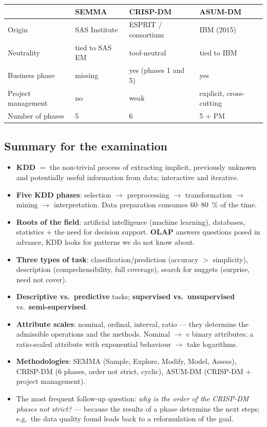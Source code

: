 \documentclass[11pt,a4paper]{article}
\theoremstyle{definition}
\begin{document}
\begin{center}
\small
\begin{tabular}{@{}llll@{}}
\toprule
& \textbf{SEMMA} & \textbf{CRISP-DM} & \textbf{ASUM-DM} \\
\midrule
Origin & SAS Institute & ESPRIT / consortium & IBM (2015) \\
Neutrality & tied to SAS EM & tool-neutral & tied to IBM \\
Business phase & missing & yes (phases 1 and 5) & yes \\
Project management & no & weak & explicit, cross-cutting \\
Number of phases & 5 & 6 & 5 + PM \\
\bottomrule
\end{tabular}
\end{center}

\subsection{Summary for the examination}

\begin{itemize}
\item \textbf{KDD} $=$ the non-trivial process of extracting implicit, previously unknown and
      potentially useful information from data; interactive and iterative.
\item \textbf{Five KDD phases}: selection $\to$ preprocessing $\to$ transformation $\to$ mining
      $\to$ interpretation. Data preparation consumes 60--80~\% of the time.
\item \textbf{Roots of the field}: artificial intelligence (machine learning), databases,
      statistics $+$ the need for decision support. \textbf{OLAP} answers questions posed in
      advance, KDD looks for patterns we do not know about.
\item \textbf{Three types of task}: classification/prediction (accuracy $>$ simplicity),
      description (comprehensibility, full coverage), search for nuggets (surprise, need not
      cover).
\item \textbf{Descriptive vs.\ predictive} tasks; \textbf{supervised vs.\ unsupervised} vs.\
      \textbf{semi-supervised}.
\item \textbf{Attribute scales}: nominal, ordinal, interval, ratio --- they determine the
      admissible operations and the methods. Nominal $\to$ $v$ binary attributes; a ratio-scaled
      attribute with exponential behaviour $\to$ take logarithms.
\item \textbf{Methodologies}: SEMMA (Sample, Explore, Modify, Model, Assess), CRISP-DM (6
      phases, order not strict, cyclic), ASUM-DM (CRISP-DM $+$ project management).
\item The most frequent follow-up question: \emph{why is the order of the CRISP-DM phases not
      strict?} --- because the results of a phase determine the next steps; e.g.\ the data
      quality found leads back to a reformulation of the goal.
\end{itemize}
\end{document}
